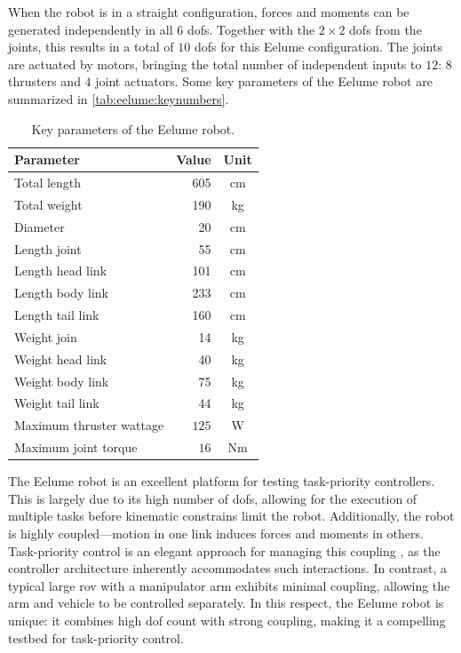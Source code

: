 When the robot is in a straight configuration, 
forces and moments can be generated independently in all $6$ \gls{dof}s. 
Together with the $2 \times 2$ \gls{dof}s from the joints, this results in a 
total of $10$ \gls{dof}s for this Eelume configuration. The joints are 
actuated by motors, bringing the total number of independent inputs to $12$:
$8$ thrusters and $4$ joint actuators. Some key parameters of the Eelume robot
are summarized in \autoref{tab:eelume:keynumbers}.
\begin{table}[h]
    \centering
    \begin{tabular}{|l|r|c|}
        \hline
        Parameter  & Value & Unit   \\ \hline \hline
        Total length & 605 &  cm    \\ \hline
        Total weight & 190  & kg    \\ \hline
        Diameter & 20 & cm    \\ \hline
        Length joint     & 55 & cm    \\ \hline
        Length head link & 101 & cm     \\ \hline
        Length body link & 233 & cm     \\ \hline
        Length tail link & 160 & cm     \\ \hline
        Weight join      & 14 & kg     \\ \hline
        Weight head link & 40 & kg     \\ \hline
        Weight body link & 75 & kg     \\ \hline
        Weight tail link & 44 & kg     \\ \hline
        Maximum thruster wattage & \(125\) & W     \\ \hline
        Maximum joint torque & \(16\) & Nm     \\ \hline
        \hline
    \end{tabular}
    \caption{Key parameters of the Eelume robot.}
    \label{tab:eelume:keynumbers}
\end{table}

The Eelume robot is an excellent platform for testing task-priority controllers.
This is largely due to its high number of \gls{dof}s, allowing for the 
execution of multiple tasks before kinematic constrains limit the robot. Additionally, 
the robot is highly coupled—motion in one link induces forces and moments in 
others. Task-priority control is an elegant approach for managing this coupling
, as the controller architecture inherently accommodates such interactions. In 
contrast, a typical large \gls{rov} with a manipulator arm exhibits minimal 
coupling, allowing the arm and vehicle to be controlled separately. In this 
respect, the Eelume robot is unique: it combines high \gls{dof} count with 
strong coupling, making it a compelling testbed for task-priority control.

